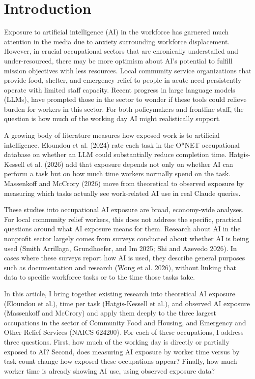 \section{Introduction}

Exposure to artificial intelligence (AI) in the workforce has garnered much attention in the media due to anxiety surrounding workforce displacement. However, in crucial occupational sectors that are chronically understaffed and under-resourced, there may be more optimism about AI's potential to fulfill mission objectives with less resources. Local community service organizations that provide food, shelter, and emergency relief to people in acute need persistently operate with limited staff capacity. Recent progress in large language models (LLMs), have prompted those in the sector to wonder if these tools could relieve burden for workers in this sector. For both policymakers and frontline staff, the question is how much of the working day AI might realistically support.

A growing body of literature measures how exposed work is to artificial intelligence. Eloundou et al. (2024) rate each task in the O*NET occupational database on whether an LLM could substantially reduce completion time. Hatgis-Kessell et al. (2026) add that exposure depends not only on whether AI can perform a task but on how much time workers normally spend on the task. Massenkoff and McCrory (2026) move from theoretical to observed exposure by measuring which tasks actually see work-related AI use in real Claude queries.

These studies into occupational AI exposure are broad, economy-wide analyses. For local community relief workers, this does not address the specific, practical questions around what AI exposure means for them. Research about AI in the nonprofit sector largely comes from surveys conducted about whether AI is being used (Smith Arrillaga, Grundhoefer, and Im 2025; Shi and Azevedo 2026). In cases where these surveys report how AI is used, they describe general purposes such as documentation and research (Wong et al. 2026), without linking that data to specific workforce tasks or to the time those tasks take.

In this article, I bring together existing research into theoretical AI exposure (Eloundou et al.), time per task (Hatgis-Kessell et al.), and observed AI exposure (Massenkoff and McCrory) and apply them deeply to the three largest occupations in the sector of Community Food and Housing, and Emergency and Other Relief Services (NAICS 624200). For each of these occupations, I address three questions. First, how much of the working day is directly or partially exposed to AI? Second, does measuring AI exposure by worker time versus by task count change how exposed these occupations appear? Finally, how much worker time is already showing AI use, using observed exposure data?

